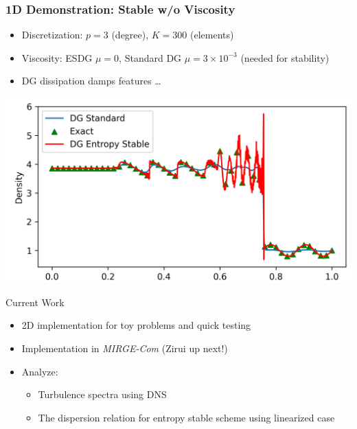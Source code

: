 \begin{frame}\frametitle{1D Demonstration:  Stable w/o Viscosity}
	\begin{itemize}
	
		\item Discretization: $p=3$ (degree), $K = 300$ (elements)
		\item Viscosity: ESDG $\mu = 0$, Standard DG $\mu = 3\times 10^{-3}$ (needed for stability)
                \item DG dissipation damps features \ldots
                \end{itemize}
                \medskip
                \begin{center}
                          \includegraphics[width=0.6\linewidth]{figures/RHO.png}          
	\end{center}
        \centerline{}
\end{frame}

\begin{frame}{Current Work}
	\begin{itemize}
		\setlength{\itemsep}{0.2in}
		\item  2D implementation for toy problems and quick testing
		\item  Implementation in \textit{MIRGE-Com} (Zirui up next!)
		\item Analyze:
		\begin{itemize}
			\item Turbulence spectra using DNS
			\item The dispersion relation for entropy stable scheme using linearized case
		\end{itemize}
	\end{itemize}
      \end{frame}


